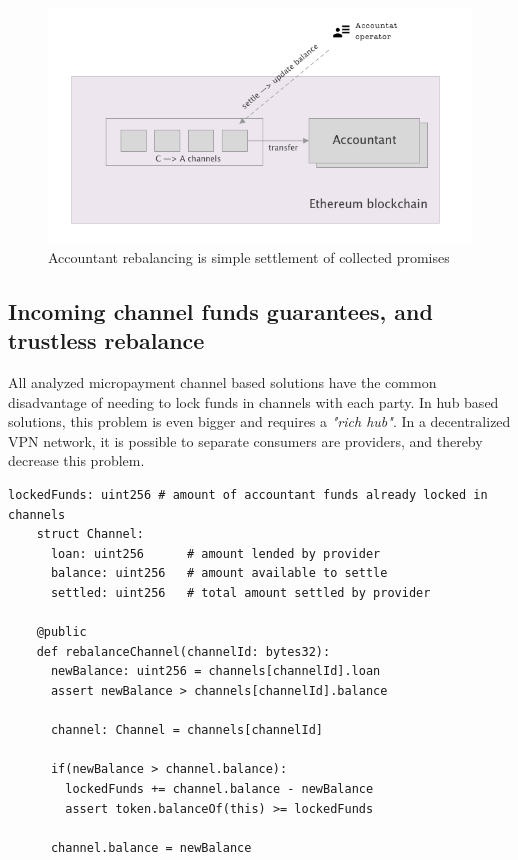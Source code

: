 \documentclass[a4paper,12pt]{article}
\begin{document}
\begin{figure}[H]
    \centering
    \includegraphics[scale=0.5]{../img/accountant-rebalance}
    \caption{Accountant rebalancing is simple settlement of collected promises}
    \label{img:accountant-rebalance}
\end{figure}

\subsection{Incoming channel funds guarantees, and trustless rebalance}

All analyzed micropayment channel based solutions have the common disadvantage of 
needing to lock funds in channels with each party. In hub based solutions, this 
problem is even bigger and requires a \textit{"rich hub"}. In a decentralized VPN 
network, it is possible to separate consumers are providers, and thereby decrease 
this problem.

\begin{lstlisting}[language=Vyper]
    lockedFunds: uint256 # amount of accountant funds already locked in channels
    struct Channel:
      loan: uint256      # amount lended by provider
      balance: uint256   # amount available to settle
      settled: uint256   # total amount settled by provider

    @public
    def rebalanceChannel(channelId: bytes32):
      newBalance: uint256 = channels[channelId].loan
      assert newBalance > channels[channelId].balance

      channel: Channel = channels[channelId]

      if(newBalance > channel.balance):
        lockedFunds += channel.balance - newBalance
        assert token.balanceOf(this) >= lockedFunds

      channel.balance = newBalance
\end{lstlisting}
\end{document}
